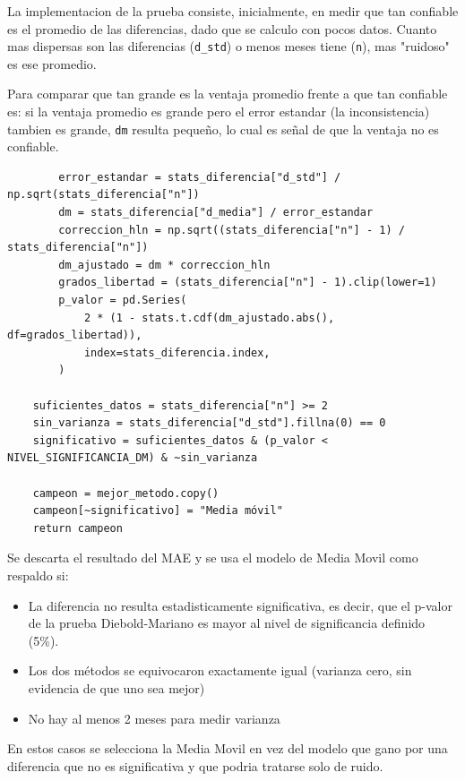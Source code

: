 La implementacion de la prueba consiste, inicialmente, en medir que tan confiable es el promedio de las diferencias, dado que se calculo con pocos datos. Cuanto mas dispersas son las diferencias (\texttt{d\_std}) o menos meses tiene (\texttt{n}), mas "ruidoso" es ese promedio.

Para comparar que tan grande es la ventaja promedio frente a que tan confiable es: si la ventaja promedio es grande pero el error estandar (la inconsistencia) tambien es grande, \texttt{dm} resulta pequeño, lo cual es señal de que la ventaja no es confiable.

\label{lst:campeon_diebold_mariano}
\begin{verbatim}
        error_estandar = stats_diferencia["d_std"] / np.sqrt(stats_diferencia["n"])
        dm = stats_diferencia["d_media"] / error_estandar
        correccion_hln = np.sqrt((stats_diferencia["n"] - 1) / stats_diferencia["n"])
        dm_ajustado = dm * correccion_hln
        grados_libertad = (stats_diferencia["n"] - 1).clip(lower=1)
        p_valor = pd.Series(
            2 * (1 - stats.t.cdf(dm_ajustado.abs(), df=grados_libertad)),
            index=stats_diferencia.index,
        )

    suficientes_datos = stats_diferencia["n"] >= 2
    sin_varianza = stats_diferencia["d_std"].fillna(0) == 0
    significativo = suficientes_datos & (p_valor < NIVEL_SIGNIFICANCIA_DM) & ~sin_varianza

    campeon = mejor_metodo.copy()
    campeon[~significativo] = "Media móvil"
    return campeon
\end{verbatim}

Se descarta el resultado del MAE y se usa el modelo de Media Movil como respaldo si:

\begin{itemize}
    \item La diferencia no resulta estadisticamente significativa, es decir, que el p-valor de la prueba Diebold-Mariano es mayor al nivel de significancia definido (5\%).
    \item Los dos métodos se equivocaron exactamente igual (varianza cero, sin evidencia de que uno sea mejor)
    \item No hay al menos 2 meses para medir varianza
\end{itemize}

En estos casos se selecciona la Media Movil en vez del modelo que gano por una diferencia que no es significativa y que podria tratarse solo de ruido.

